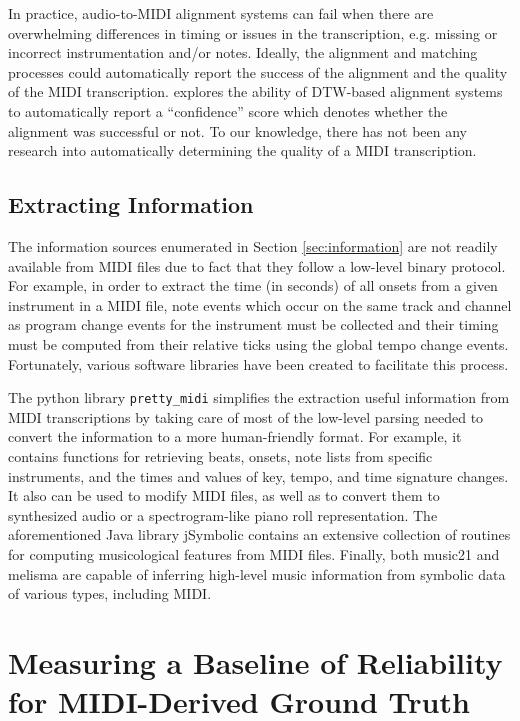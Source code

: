 \documentclass{article}
\begin{document}
In practice, audio-to-MIDI alignment systems can fail when there are overwhelming differences in timing or issues in the transcription, e.g. missing or incorrect instrumentation and/or notes.
Ideally, the alignment and matching processes could automatically report the success of the alignment and the quality of the MIDI transcription.
\cite{raffel2016optimizing} explores the ability of DTW-based alignment systems to automatically report a ``confidence'' score which denotes whether the alignment was successful or not.
To our knowledge, there has not been any research into automatically determining the quality of a MIDI transcription.

\subsection{Extracting Information}

The information sources enumerated in Section \ref{sec:information} are not readily available from MIDI files due to fact that they follow a low-level binary protocol.
For example, in order to extract the time (in seconds) of all onsets from a given instrument in a MIDI file, note events which occur on the same track and channel as program change events for the instrument must be collected and their timing must be computed from their relative ticks using the global tempo change events.
Fortunately, various software libraries have been created to facilitate this process.

The python library \texttt{pretty\_midi} \cite{raffel2014pretty_midi} simplifies the extraction useful information from MIDI transcriptions by taking care of most of the low-level parsing needed to convert the information to a more human-friendly format.
For example, it contains functions for retrieving beats, onsets, note lists from specific instruments, and the times and values of key, tempo, and time signature changes.
It also can be used to modify MIDI files, as well as to convert them to synthesized audio or a spectrogram-like piano roll representation.
The aforementioned Java library jSymbolic contains an extensive collection of routines for computing musicological features from MIDI files.
Finally, both music21 and melisma are capable of inferring high-level music information from symbolic data of various types, including MIDI.

\section{Measuring a Baseline of Reliability for MIDI-Derived Ground Truth}
\label{sec:measuring}
\end{document}
